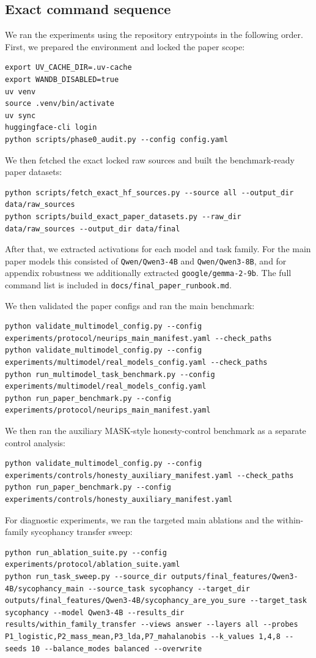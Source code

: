 \subsection{Exact command sequence}

We ran the experiments using the repository entrypoints in the following order. First, we prepared the environment and locked the paper scope:
\begin{verbatim}
export UV_CACHE_DIR=.uv-cache
export WANDB_DISABLED=true
uv venv
source .venv/bin/activate
uv sync
huggingface-cli login
python scripts/phase0_audit.py --config config.yaml
\end{verbatim}

We then fetched the exact locked raw sources and built the benchmark-ready paper datasets:
\begin{verbatim}
python scripts/fetch_exact_hf_sources.py --source all --output_dir data/raw_sources
python scripts/build_exact_paper_datasets.py --raw_dir data/raw_sources --output_dir data/final
\end{verbatim}

After that, we extracted activations for each model and task family. For the main paper models this consisted of \texttt{Qwen/Qwen3-4B} and \texttt{Qwen/Qwen3-8B}, and for appendix robustness we additionally extracted \texttt{google/gemma-2-9b}. The full command list is included in \texttt{docs/final\_paper\_runbook.md}.

We then validated the paper configs and ran the main benchmark:
\begin{verbatim}
python validate_multimodel_config.py --config experiments/protocol/neurips_main_manifest.yaml --check_paths
python validate_multimodel_config.py --config experiments/multimodel/real_models_config.yaml --check_paths
python run_multimodel_task_benchmark.py --config experiments/multimodel/real_models_config.yaml
python run_paper_benchmark.py --config experiments/protocol/neurips_main_manifest.yaml
\end{verbatim}

We then ran the auxiliary MASK-style honesty-control benchmark as a separate control analysis:
\begin{verbatim}
python validate_multimodel_config.py --config experiments/controls/honesty_auxiliary_manifest.yaml --check_paths
python run_paper_benchmark.py --config experiments/controls/honesty_auxiliary_manifest.yaml
\end{verbatim}

For diagnostic experiments, we ran the targeted main ablations and the within-family sycophancy transfer sweep:
\begin{verbatim}
python run_ablation_suite.py --config experiments/protocol/ablation_suite.yaml
python run_task_sweep.py --source_dir outputs/final_features/Qwen3-4B/sycophancy_main --source_task sycophancy --target_dir outputs/final_features/Qwen3-4B/sycophancy_are_you_sure --target_task sycophancy --model Qwen3-4B --results_dir results/within_family_transfer --views answer --layers all --probes P1_logistic,P2_mass_mean,P3_lda,P7_mahalanobis --k_values 1,4,8 --seeds 10 --balance_modes balanced --overwrite
\end{verbatim}


